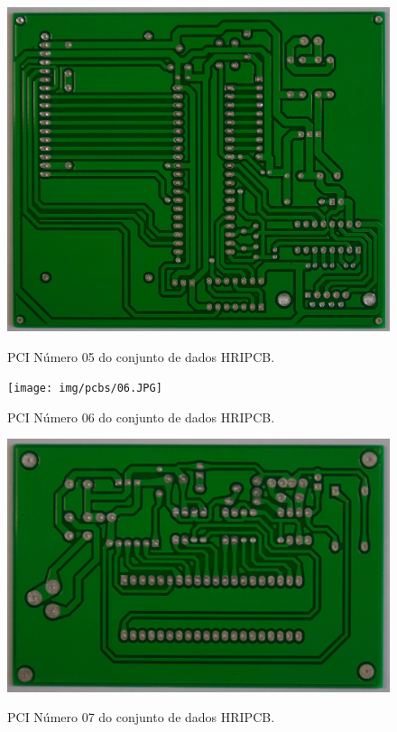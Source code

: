 \begin{figure}[!h] %
  \centering
  \caption{PCI Número 05 do conjunto de dados HRIPCB.}
  \includegraphics[scale=0.13]{img/pcbs/05.JPG}
  \label{fig:ap-pcbs-5}
\end{figure}

\begin{figure}[!h] %
  \centering
  \caption{PCI Número 06 do conjunto de dados HRIPCB.}
  \texttt{[image: img/pcbs/06.JPG]}
  \label{fig:ap-pcbs-6}
\end{figure}

\begin{figure}[!h] %
  \centering
  \caption{PCI Número 07 do conjunto de dados HRIPCB.}
  \includegraphics[scale=0.13]{img/pcbs/07.JPG}
  \label{fig:ap-pcbs-7}
\end{figure}

